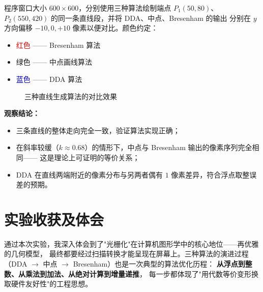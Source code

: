 \documentclass[a4paper,12pt]{ctexart}
\begin{document}
程序窗口大小 $600\times 600$，分别使用三种算法绘制端点
$P_1(50,80)$、$P_2(550,420)$ 的同一条直线段，并将 DDA、中点、Bresenham 的输出
分别在 $y$ 方向偏移 $-10,0,+10$ 像素以便对比。颜色约定：

\begin{itemize}[leftmargin=2em,itemsep=0.2em]
    \item \textcolor{red}{红色} —— Bresenham 算法
    \item \textcolor{green!60!black}{绿色} —— 中点画线算法
    \item \textcolor{blue}{蓝色} —— DDA 算法
\end{itemize}

\begin{figure}[H]
    \centering
    \caption{三种直线生成算法的对比效果}
\end{figure}

\textbf{观察结论：}
\begin{itemize}[leftmargin=2em,itemsep=0.2em]
    \item 三条直线的整体走向完全一致，验证算法实现正确；
    \item 在斜率较缓（$k\approx 0.68$）的情形下，中点与 Bresenham 输出的像素序列完全相同——
        这是理论上可证明的等价关系；
    \item DDA 在直线两端附近的像素分布与另两者偶有 $1$ 像素差异，符合浮点取整误差的预期。
\end{itemize}

\section{实验收获及体会}

通过本次实验，我深入体会到了"光栅化"在计算机图形学中的核心地位——再优雅的几何模型，
最终都要经过扫描转换才能呈现在屏幕上。三种算法的演进过程
（DDA $\to$ 中点 $\to$ Bresenham）也是一次典型的算法优化历程：
\textbf{从浮点到整数、从乘法到加法、从绝对计算到增量递推}，
每一步都体现了"用代数等价变形换取硬件友好性"的工程思想。
\end{document}
